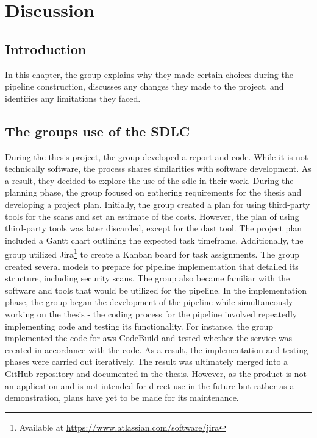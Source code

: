 \newpage
\thispagestyle{empty}
\mbox{}

\chapter{Discussion}
\section{Introduction}
In this chapter, the group explains why they made certain choices during the pipeline construction, discusses any changes they made to the project, and identifies any limitations they faced.


\section{The groups use of the SDLC} %
During the thesis project, the group developed a report and code. While it is not technically software, the process shares similarities with software development. As a result, they decided to explore the use of the \acrshort{sdlc} in their work.
During the planning phase, the group focused on gathering requirements for the thesis and developing a project plan. Initially, the group created a plan for using third-party tools for the scans and set an estimate of the costs. However, the plan of using third-party tools was later discarded, except for the \acrshort{dast} tool. The project plan included a Gantt chart outlining the expected task timeframe. Additionally, the group utilized Jira\footnote{Available at \url{https://www.atlassian.com/software/jira}} to create a Kanban board for task assignments. The group created several models to prepare for pipeline implementation that detailed its structure, including security scans. The group also became familiar with the software and tools that would be utilized for the pipeline.
In the implementation phase, the group began the development of the pipeline while simultaneously working on the thesis - the coding process for the pipeline involved repeatedly implementing code and testing its functionality. For instance, the group implemented the code for \acrshort{aws} CodeBuild and tested whether the service was created in accordance with the code. As a result, the implementation and testing phases were carried out iteratively.
The result was ultimately merged into a GitHub repository and documented in the thesis. However, as the product is not an application and is not intended for direct use in the future but rather as a demonstration, plans have yet to be made for its maintenance. 

